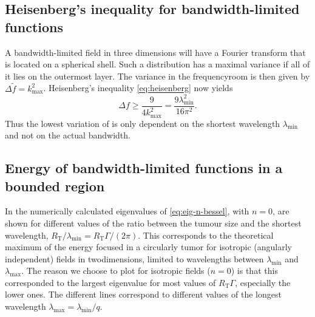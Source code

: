 \documentclass[11pt,a4paper, 
swedish,english %
]{article}
\newcommand{\RT}{\ensuremath{R_{\text{T}}}}
\newcommand{\tf}{\ensuremath{\tilde{f}}}
\begin{document}
\subsection{Heisenberg's inequality for bandwidth-limited functions}
A bandwidth-limited field in three dimensions will have a Fourier transform that is located on a spherical
shell. Such a distribution has a maximal variance if all of it lies on the outermost layer. The variance
in the frequencyroom is then given by $\Delta \tf=k_{\max}^2$. Heisenberg's inequality \eqref{eq:heisenberg}
now yields
\begin{equation}
\Delta f \geq \frac{9}{4k_{\max}^2}=\frac{9\lambda_{\min}^2}{16\pi^2}.
\end{equation}
Thus the lowest variation of is only dependent on the shortest wavelength $\lambda_{\min}$ and not on the actual bandwidth.

\subsection{Energy of bandwidth-limited functions in a bounded region}
In  the numerically calculated eigenvalues of \eqref{eq:eig-n-bessel}, with $n=0$, are shown for different values of the ratio between the tumour size and the shortest wavelength, $\RT/\lambda_{\min}=\RT\Gamma/(2\pi)$. This corresponds to the theoretical maximum of the energy focused in a circularly tumor for isotropic (angularly independent) fields in twodimensions, limited to wavelengths between $\lambda_{\min}$ and $\lambda_{\max}$.
The reason we choose to plot for isotropic fields ($n=0$) is that this corresponded to the largest eigenvalue for most values of $\RT\Gamma$, especially the lower ones.
The different lines correspond to different values of the longest wavelength $\lambda_{\max}=\lambda_{\min}/q$. 
\end{document}
